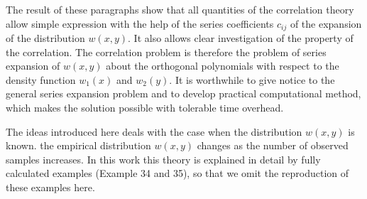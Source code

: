 \documentclass{article}
\begin{document}
The result of these paragraphs show that all quantities of
the correlation theory allow simple expression with the help of the
series coefficients $c_{ij}$ of the expansion of the distribution
$w(x,y)$. It also allows clear investigation of
the property of the correlation.
The correlation problem is therefore the problem of series
expansion of $w(x,y)$ about the orthogonal polynomials with
respect to the density function 
$w_1(x)$ and $w_2(y)$.
It is worthwhile to give notice to the 
general series expansion problem and to develop
practical computational method, which makes the solution
possible with tolerable time overhead.

The ideas introduced here deals with the case when
the distribution $w(x,y)$ is known.
the empirical distribution $w(x,y)$ changes as the number of observed
samples increases.
In this work this theory is explained in detail by fully calculated
examples (Example 34 and 35), so that we omit the reproduction of these examples here.
\end{document}
